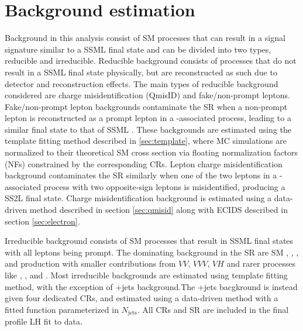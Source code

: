 \documentclass[../thesis.tex]{subfiles}
\begin{document}
\section{Background estimation}
\label{sec:bg}
Background in this analysis consist of \acs{SM} processes that can result in a signal signature similar to a \tttt \acs{SSML} final state and can be divided into two types, reducible and irreducible. Reducible background consists of processes that do not result in a \acs{SSML} final state physically, but are reconstructed as such due to detector and reconstruction effects. The main types of reducible background considered are charge misidentification (\acs{QmisID}) and fake/non-prompt leptons. Fake/non-prompt lepton backgrounds contaminate the \acs{SR} when a non-prompt lepton is reconstructed as a prompt lepton in a \ttbar-associated process, leading to a similar final state to that of \acs{SSML} \tttt. These backgrounds are estimated using the template fitting method described in \autoref{sec:template}, where \acs{MC} simulations are normalized to their theoretical \acs{SM} cross section via floating normalization factors (\acs{NF}s) constrained by the corresponding \acs{CR}s. Lepton charge misidentification background contaminates the \acs{SR} similarly when one of the two leptons in a \ttbar-associated process with two opposite-sign leptons is misidentified, producing a \acs{SS2L} \tttt final state. Charge misidentification background is estimated using a data-driven method described in section \ref{sec:qmisid} along with \acs{ECIDS} described in section \ref{sec:electron}.

Irreducible background consists of \acs{SM} processes that result in \acs{SSML} final states with all leptons being prompt. The dominating background in the \acs{SR} are \acs{SM} \tttt, \ttW, \ttZ, and \ttH production with smaller contributions from $VV$, $VVV$, $VH$ and rarer processes like \ttVV, \tWZ, \tZq and \ttt. Most irreducible backgrounds are estimated using template fitting method, with the exception of \ttW+jets background.The \ttW+jets bacgkround is instead given four dedicated \acs{CR}s, and estimated using a data-driven method with a fitted function parameterized in $N_\mathrm{jets}$. All \acs{CR}s and \acs{SR} are included in the final profile \acs{LH} fit to data.
\end{document}
